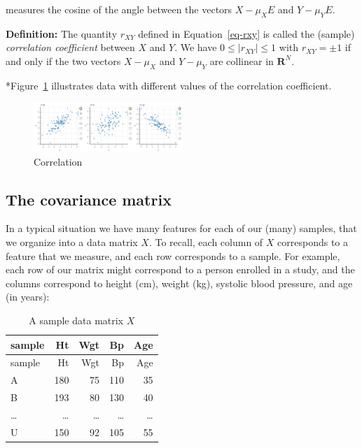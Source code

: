 \documentclass[
  11pt,
  letterpaper,
]{scrbook}
\theoremstyle{plain}
\theoremstyle{plain}
\theoremstyle{remark}
\begin{document}
measures the cosine of the angle between the vectors \(X-\mu_{X}E\) and
\(Y-\mu_{Y}E\).

\textbf{Definition:} The quantity \(r_{XY}\) defined in
Equation~\ref{eq-rxy} is called the (sample) \emph{correlation
coefficient} between \(X\) and \(Y\). We have \(0\le |r_{XY}|\le 1\)
with \(r_{XY}=\pm 1\) if and only if the two vectors \(X-\mu_{X}\) and
\(Y-\mu_{Y}\) are collinear in \(\mathbf{R}^{N}\).

*Figure~\ref{fig-corrfig} illustrates data with different values of the
correlation coefficient.

\begin{figure}

{\centering \includegraphics[width=0.5\textwidth,height=\textheight]{chapters/img/correlation.png}

}

\caption{\label{fig-corrfig}Correlation}

\end{figure}

\hypertarget{sec-covarmat}{%
\subsection{The covariance matrix}\label{sec-covarmat}}

In a typical situation we have many features for each of our (many)
samples, that we organize into a data matrix \(X\). To recall, each
column of \(X\) corresponds to a feature that we measure, and each row
corresponds to a sample. For example, each row of our matrix might
correspond to a person enrolled in a study, and the columns correspond
to height (cm), weight (kg), systolic blood pressure, and age (in
years):

\begin{longtable}[]{@{}lrrrr@{}}
\caption{A sample data matrix \(X\)}\tabularnewline
\toprule()
sample & Ht & Wgt & Bp & Age \\
\midrule()
\endfirsthead
\toprule()
sample & Ht & Wgt & Bp & Age \\
\midrule()
\endhead
A & 180 & 75 & 110 & 35 \\
B & 193 & 80 & 130 & 40 \\
\ldots{} & \ldots{} & \ldots{} & \ldots{} & \ldots{} \\
U & 150 & 92 & 105 & 55 \\
\bottomrule()
\end{longtable}
\end{document}
